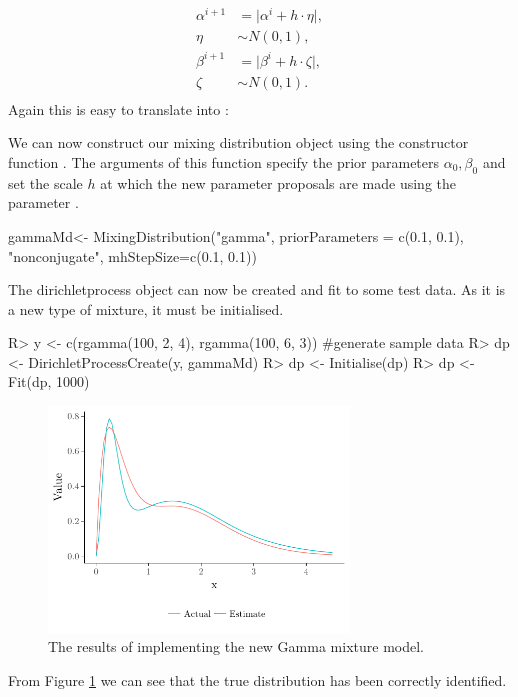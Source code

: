 \documentclass[nojss]{jss}
\begin{document}
\begin{align*}
\alpha ^{i+1} & = \lvert \alpha ^{i} + h \cdot \eta \lvert ,\\
\eta & \sim N(0, 1), \\
\beta ^{i+1} & = \lvert \beta ^{i} + h \cdot \zeta \lvert, \\
\zeta & \sim N(0, 1). \\
\end{align*}
Again this  is easy to translate into :

We can now construct our mixing distribution object using the constructor function . The arguments of this function specify the prior parameters $\alpha _0, \beta _0$ and set the scale $h$ at which the new parameter proposals are made using the parameter .
\begin{CodeInput}
gammaMd<- MixingDistribution("gamma", priorParameters = c(0.1, 0.1),
"nonconjugate", mhStepSize=c(0.1, 0.1))
\end{CodeInput}

The dirichletprocess object can now be created and fit to some test data. As it is a new type of mixture, it must be initialised.
\begin{Schunk}
\begin{Sinput}
R> y <- c(rgamma(100, 2, 4), rgamma(100, 6, 3)) #generate sample data
R> dp <- DirichletProcessCreate(y, gammaMd)
R> dp <- Initialise(dp)
R> dp <- Fit(dp, 1000)
\end{Sinput}
\end{Schunk}
\begin{figure}[tb]
\centering
	\includegraphics[height=60mm, width=80mm]{img/gamma_mixture_plot.pdf}
\caption{The results of implementing the new Gamma mixture model.}
\label{fig:gammamixture}
\end{figure}
From Figure \ref{fig:gammamixture} we can see that the true distribution has been correctly identified.
\end{document}

